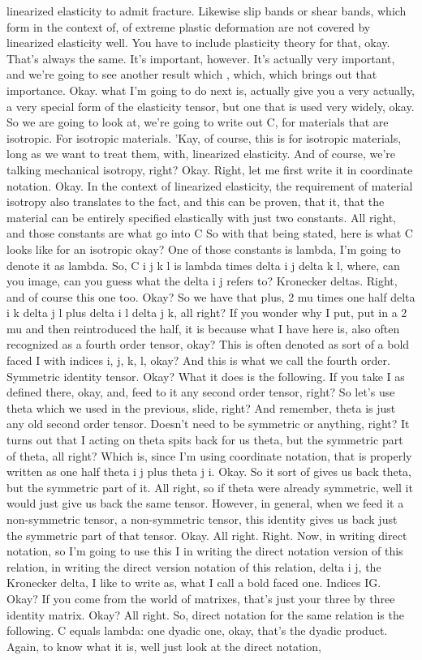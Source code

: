 \documentclass[10pt]{article}
\begin{document}
linearized elasticity to admit fracture. Likewise slip bands or shear bands, which form in the context of, of extreme plastic deformation are not covered by linearized elasticity well. You have to include plasticity theory for that, okay. That's always the same. It's important, however. It's actually very important, and we're going to see another result which , which, which brings out that importance. Okay.  what I'm going to do next is, actually give you a very actually, a very special form of the elasticity tensor, but one that is used very widely, okay. So we are going to look at, we're going to write out C, for materials that are isotropic. For isotropic materials. 'Kay, of course, this is for isotropic materials, long as we want to treat them, with, linearized elasticity. And of course, we're talking mechanical isotropy, right? Okay. Right, let me first write it in coordinate notation. Okay. In the context of linearized elasticity, the requirement of material isotropy also translates to the fact, and this can be proven, that it, that the material can be entirely specified elastically with just two constants. All right, and those constants are what go into C So with that being stated, here is what C looks like for an isotropic okay? One of those constants is lambda, I'm going to denote it as lambda. So, C i j k l is lambda times delta i j delta k l, where, can you image, can you guess what the delta i j refers to? Kronecker deltas. Right, and of course this one too. Okay? So we have that plus, 2 mu times one half delta i k delta j l plus delta i l delta j k, all right? If you wonder why I put, put in a 2 mu and then reintroduced the half, it is because what I have here is, also often recognized as a fourth order tensor, okay? This is often denoted as sort of a bold faced I with indices i, j, k, l, okay? And this is what we call the fourth order. Symmetric identity tensor. Okay? What it does is the following. If you take I as defined there, okay, and, feed to it any second order tensor, right? So let's use theta which we used in the previous, slide, right? And remember, theta is just any old second order tensor. Doesn't need to be symmetric or anything, right? It turns out that I acting on theta spits back for us theta, but the symmetric part of theta, all right? Which is, since I'm using coordinate notation, that is properly written as one half theta i j plus theta j i. Okay. So it sort of gives us back theta, but the symmetric part of it. All right, so if theta were already symmetric, well it would just give us back the same tensor. However, in general, when we feed it a non-symmetric tensor, a non-symmetric tensor, this identity gives us back just the symmetric part of that tensor. Okay. All right. Right. Now, in writing direct notation, so I'm going to use this I in writing the direct notation version of this relation, in writing the direct version notation of this relation, delta i j, the Kronecker delta, I like to write as, what I call a bold faced one. Indices IG. Okay? If you come from the world of matrixes, that's just your three by three identity matrix. Okay? All right. So, direct notation for the same relation is the following. C equals lambda: one dyadic one, okay, that's the dyadic product. Again, to know what it is, well just look at the direct notation, 
\end{document}
